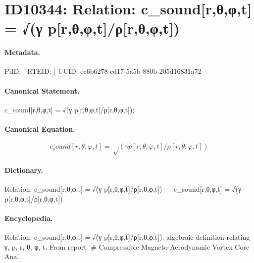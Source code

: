 \section*{ID10344: Relation: c\_sound[r,θ,φ,t] = √(γ p[r,θ,φ,t]/ρ[r,θ,φ,t])}
\paragraph{Metadata.}
PiID:  | RTEID:  | UUID: ec6b6278-cd17-5a5b-880b-205d16831a72

\paragraph{Canonical Statement.}
c\_sound[r,θ,φ,t] = √(γ p[r,θ,φ,t]/ρ[r,θ,φ,t]);

\paragraph{Canonical Equation.}
\[
c_sound[r,θ,φ,t] = √(γ p[r,θ,φ,t]/ρ[r,θ,φ,t])
\]

\paragraph{Dictionary.}
Relation: c\_sound[r,θ,φ,t] = √(γ p[r,θ,φ,t]/ρ[r,θ,φ,t]) — c\_sound[r,θ,φ,t] = √(γ p[r,θ,φ,t]/ρ[r,θ,φ,t])

\paragraph{Encyclopedia.}
Relation: c\_sound[r,θ,φ,t] = √(γ p[r,θ,φ,t]/ρ[r,θ,φ,t]): algebraic definition relating γ, p, r, θ, φ, t. From report '\# Compressible Magneto-Aerodynamic Vortex Core Ana'.
